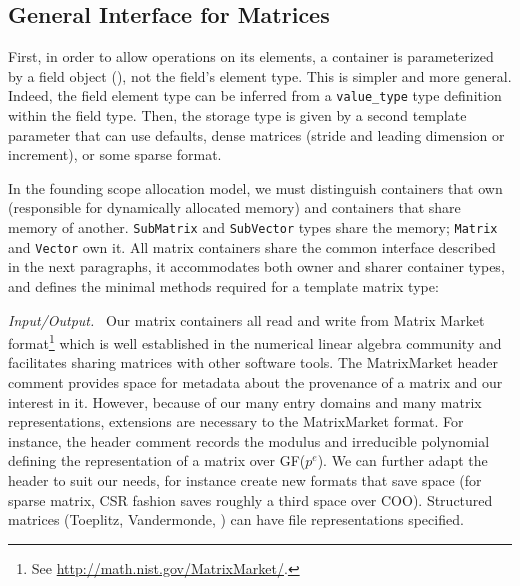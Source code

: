 \subsection{General Interface for %
Matrices}
%
First, in order to allow operations on its elements, a container is
parameterized by a field object (), not the field's element
type. This is simpler and more general.
Indeed, the field element type can be inferred from a
\verb!value_type! type definition within the field type.
Then, the storage type is given by a second
template parameter that can use defaults,
\eg dense \blas matrices (stride
and leading dimension or increment), or some sparse format.
%

%
In the founding scope allocation model, we must distinguish containers that own (responsible for
dynamically allocated memory) and containers that share memory of another.
\texttt{SubMatrix} and \texttt{SubVector} types share the memory;
\texttt{Matrix} and \texttt{Vector} own it.
%
All matrix containers share the common \applin  interface
described in the next paragraphs, it accommodates both owner and sharer
container types, and defines the minimal methods required for a
template \applin matrix type:
%
% 
%
%
\def\monitem#1{\par\textit{#1}\ }
\monitem{Input/Output.}
		Our matrix containers all read and write from Matrix Market
		format\footnote{See \url{http://math.nist.gov/MatrixMarket/}.}
		which is well established in the numerical linear algebra
		community and facilitates sharing matrices
		with other software tools.  The MatrixMarket header comment provides space for
		metadata about the provenance of a matrix and our interest in
		it.  However, because of our many entry
		domains and many matrix representations,
		extensions are necessary to the MatrixMarket format.
		For instance, the header comment records the modulus and
		irreducible polynomial defining the representation of a matrix over
		GF($p^e$).
We can further adapt the header to suit our needs, for instance
create new formats that save space (for sparse matrix, CSR fashion saves
roughly a third space over COO). Structured matrices
(Toeplitz, Vandermonde, \etc)
can have file representations specified.
%
